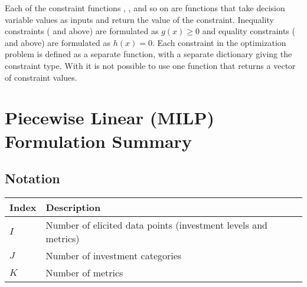 \documentclass[letterpaper,10pt,english]{sphinxmanual}
\begin{document}
Each of the constraint functions , , and so on are
functions that take decision variable values as inputs and return the
value of the constraint. Inequality constraints ( and 
above) are formulated as \(g(x) \geq 0\) and equality constraints
( and  above) are formulated as \(h(x) = 0\). Each
constraint in the optimization problem is defined as a separate
function, with a separate dictionary giving the constraint type. With
 it is not possible to use one function that returns a vector of
constraint values.


\section{Piecewise Linear (MILP) Formulation Summary}
\label{\detokenize{optimizers:piecewise-linear-milp-formulation-summary}}

\subsection{Notation}
\label{\detokenize{optimizers:notation}}

\begin{savenotes}\sphinxattablestart
\centering
{}
\sphinxthecaptionisattop
{}\label{\detokenize{optimizers:table-1}}\label{\detokenize{optimizers:tbl-milpindex}}
\sphinxaftertopcaption
\begin{tabulary}{\linewidth}[t]{|T|T|}
\hline
\sphinxstyletheadfamily 
Index
&\sphinxstyletheadfamily 
Description
\\
\hline
\(I\)
&
Number of elicited data points (investment levels and metrics)
\\
\hline
\(J\)
&
Number of investment categories
\\
\hline
\(K\)
&
Number of metrics
\\
\hline
\end{tabulary}
\par
\sphinxattableend\end{savenotes}
\end{document}
